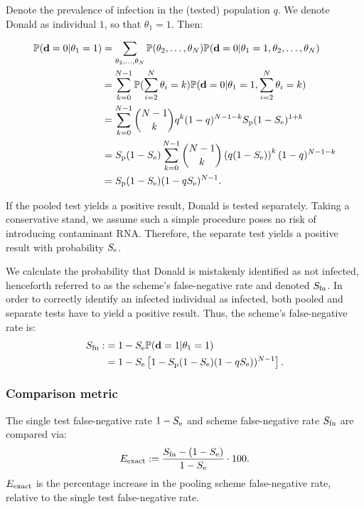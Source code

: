 \documentclass{article}
\begin{document}
Denote the prevalence of infection in the (tested) population $q$. We
denote Donald as individual $1$, so that $\theta_1=1$. Then:

\begin{align}
  \begin{split}
    \mathbb{P}(\mathbf{d}=0|\theta_1=1) &= \sum_{\theta_2,\dots,\theta_N}
    \mathbb{P}(\theta_2,\dots,\theta_N)
    \mathbb{P}(\mathbf{d}=0|\theta_1=1,\theta_2,\dots,\theta_N) \\
    &= \sum_{k=0}^{N-1}\mathbb{P}(\sum_{i=2}^N\theta_i=k)
    \mathbb{P}(\mathbf{d}=0|\theta_1=1,\sum_{i=2}^N\theta_i = k)\\
    &= \sum_{k=0}^{N-1}\binom{N-1}{k}q^k(1-q)^{N-1-k} S_\text{p}(1-S_\text{e})^{1+k}\\
    &= S_\text{p}(1-S_\text{e}) \sum_{k=0}^{N-1}\binom{N-1}{k}
    \left(q(1-S_\text{e})\right)^k(1-q)^{N-1-k}\\
    &= S_\text{p}(1-S_\text{e})(1-qS_\text{e})^{N-1}. \\
  \end{split}
\end{align}

If the pooled test yields a positive result, Donald is tested
separately. Taking a conservative stand, we assume such a simple
procedure poses no risk of introducing contaminant RNA. Therefore, the
separate test yields a positive result with probability $S_\text{e}$.

We calculate the probability that Donald is mistakenly identified as
not infected, henceforth referred to as the scheme's false-negative
rate and denoted $S_{\text{fn}}$. In order to correctly identify an infected individual
as infected, both pooled and separate tests have to yield a positive
result. Thus, the scheme's false-negative rate is:
\begin{align}\label{eq:sfn}
    \begin{split}
        S_{\text{fn}} :&= 1 - S_\text{e}\mathbb{P}(\mathbf{d}=1|\theta_1=1)\\
        &= 1 - S_\text{e}\left [1 - S_\text{p}(1-S_\text{e})(1-qS_\text{e}))^{N-1}\right].
    \end{split}
\end{align}

\subsubsection*{Comparison metric}
The single test false-negative rate $1-S_\text{e}$ and scheme false-negative
rate $S_{\text{fn}}$ are compared via:
\begin{equation}\label{eq:erel}
E_{\text{{exact}}} := \frac{S_{\text{fn}} - (1-S_\text{e})}{1-S_\text{e}} \cdot 100.
\end{equation}
$E_{\text{{exact}}}$ is the percentage increase in the pooling scheme
false-negative rate, relative to the single test false-negative rate.
\end{document}
